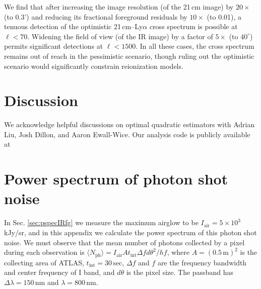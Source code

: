 \documentclass{emulateapj}
\begin{document}
We find that after increasing the image resolution (of the 21\,cm image) by $20\times$ (to 0.3') and reducing its fractional foreground residuals by $10\times$ (to 0.01), a tenuous detection of the optimistic 21\,cm--Ly$\alpha$ cross spectrum is possible at $\ell<70$. Widening the field of view (of the IR image) by a factor of $5\times$ (to $40^\circ$) permits significant detections at $\ell<1500$. In all these cases, the cross spectrum remains out of reach in the pessimistic scenario, though ruling out the optimistic scenario would significantly constrain reionization models.

\section{Discussion}


\begin{acknowledgments}
We acknowledge helpful discussions on optimal quadratic estimators with Adrian Liu, Josh Dillon, and Aaron Ewall-Wice. 
Our analysis code is publicly available at 
\end{acknowledgments}

\appendix

\section{Power spectrum of photon shot noise}
\label{sec:Pshot}

In Sec. \ref{sec:pspecIRfg} we measure the maximum airglow to be $I_\text{air}=5\times10^3$ kJy/sr, and in this appendix we calculate the power spectrum of this photon shot noise. We must observe that the mean number of photons collected by a pixel during each observation is $\langle N_\text{ph}\rangle=I_\text{air}At_\text{int} \Delta f d\theta^2/hf$, where $A=(0.5\,\text{m})^2$ is the collecting area of ATLAS, $t_\text{int}=30\,$sec, $\Delta f$ and $f$ are the frequency bandwidth and center frequency of I band, and $d\theta$ is the pixel size. The passband has $\Delta\lambda=150\,$nm and $\lambda=800\,$nm. 
\end{document}
